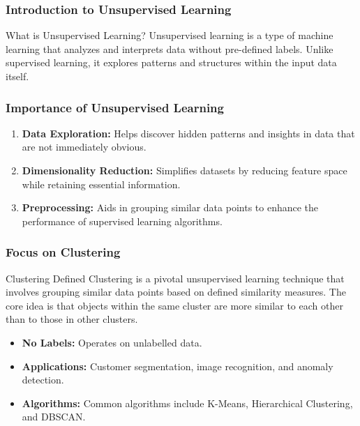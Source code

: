 \documentclass[aspectratio=169]{beamer}
\begin{document}
\frame{\titlepage}

\begin{frame}[fragile]
    \frametitle{Introduction to Unsupervised Learning}
    \begin{block}{What is Unsupervised Learning?}
        Unsupervised learning is a type of machine learning that analyzes and interprets data without pre-defined labels. 
        Unlike supervised learning, it explores patterns and structures within the input data itself.
    \end{block}
\end{frame}

\begin{frame}[fragile]
    \frametitle{Importance of Unsupervised Learning}
    \begin{enumerate}
        \item \textbf{Data Exploration:} Helps discover hidden patterns and insights in data that are not immediately obvious.
        \item \textbf{Dimensionality Reduction:} Simplifies datasets by reducing feature space while retaining essential information.
        \item \textbf{Preprocessing:} Aids in grouping similar data points to enhance the performance of supervised learning algorithms.
    \end{enumerate}
\end{frame}

\begin{frame}[fragile]
    \frametitle{Focus on Clustering}
    \begin{block}{Clustering Defined}
        Clustering is a pivotal unsupervised learning technique that involves grouping similar data points based on defined similarity measures. 
        The core idea is that objects within the same cluster are more similar to each other than to those in other clusters.
    \end{block}
    \begin{itemize}
        \item \textbf{No Labels:} Operates on unlabelled data.
        \item \textbf{Applications:} Customer segmentation, image recognition, and anomaly detection.
        \item \textbf{Algorithms:} Common algorithms include K-Means, Hierarchical Clustering, and DBSCAN.
    \end{itemize}
\end{frame}
\end{document}
